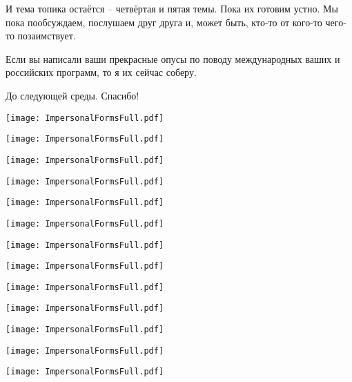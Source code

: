 \documentclass[main.tex]{subfiles}
\begin{document}
И тема топика остаётся -- четвёртая и пятая темы.
Пока их готовим устно.
Мы пока пообсуждаем, послушаем друг друга и, может быть, кто-то от кого-то чего-то позаимствует.

Если вы написали ваши прекрасные опусы по поводу международных ваших и российских программ, то я их сейчас соберу.

До следующей среды.
Спасибо!

\newpage
{}
\label{subsec:impersonal-forms-full-view}

{\parindent25pt\texttt{[image: ImpersonalFormsFull.pdf]}}\newpage

{\parindent25pt\texttt{[image: ImpersonalFormsFull.pdf]}}\newpage

{\parindent25pt\texttt{[image: ImpersonalFormsFull.pdf]}}\newpage

{\parindent25pt\texttt{[image: ImpersonalFormsFull.pdf]}}\newpage

{\parindent25pt\texttt{[image: ImpersonalFormsFull.pdf]}}\newpage

{\parindent25pt\texttt{[image: ImpersonalFormsFull.pdf]}}\newpage

{\parindent25pt\texttt{[image: ImpersonalFormsFull.pdf]}}\newpage

{\parindent25pt\texttt{[image: ImpersonalFormsFull.pdf]}}\newpage

{\parindent25pt\texttt{[image: ImpersonalFormsFull.pdf]}}\newpage

{\parindent25pt\texttt{[image: ImpersonalFormsFull.pdf]}}\newpage

{\parindent25pt\texttt{[image: ImpersonalFormsFull.pdf]}}\newpage

{\parindent25pt\texttt{[image: ImpersonalFormsFull.pdf]}}\newpage

{\parindent25pt\texttt{[image: ImpersonalFormsFull.pdf]}}\newpage
\end{document}
